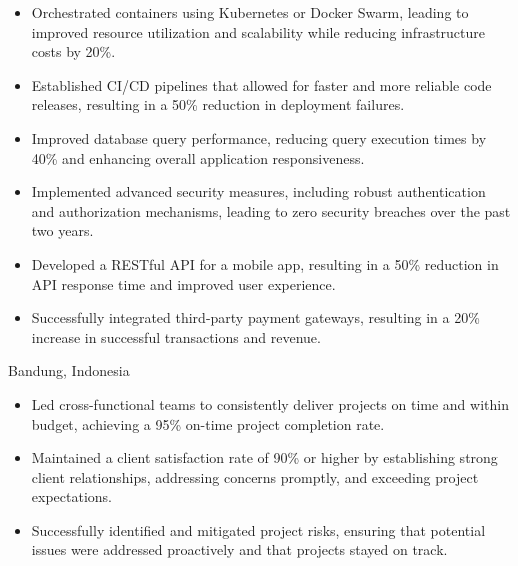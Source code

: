 \documentclass[10pt,a4paper,ragged2e,withhyper]{altacv}
\begin{document}
\begin{paracol}{2}
\begin{itemize}
\item Orchestrated containers using Kubernetes or Docker Swarm, leading to improved resource utilization and scalability while reducing infrastructure costs by 20\%.

\item Established CI/CD pipelines that allowed for faster and more reliable code releases, resulting in a 50\% reduction in deployment failures.
\end{itemize}

\divider


\begin{itemize}
\item Improved database query performance, reducing query execution times by 40\% and enhancing overall application responsiveness.

\item Implemented advanced security measures, including robust authentication and authorization mechanisms, leading to zero security breaches over the past two years.

\item Developed a RESTful API for a mobile app, resulting in a 50\% reduction in API response time and improved user experience.

\item Successfully integrated third-party payment gateways, resulting in a 20\% increase in successful transactions and revenue.
\end{itemize}


 {Bandung, Indonesia}

\begin{itemize}
\item Led cross-functional teams to consistently deliver projects on time and within budget, achieving a 95\% on-time project completion rate.

\item Maintained a client satisfaction rate of 90\% or higher by establishing strong client relationships, addressing concerns promptly, and exceeding project expectations.

\item Successfully identified and mitigated project risks, ensuring that potential issues were addressed proactively and that projects stayed on track.


\end{itemize}
\end{paracol}
\end{document}
